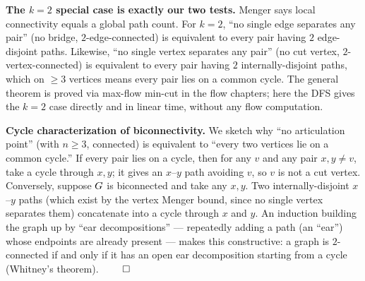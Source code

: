 \begin{whybox}
\textbf{The $k=2$ special case is exactly our two tests.} Menger says local
connectivity equals a global path count. For $k=2$, ``no single edge separates any
pair'' (no bridge, $2$-edge-connected) is equivalent to every pair having $2$
edge-disjoint paths. Likewise, ``no single vertex separates any pair'' (no cut
vertex, $2$-vertex-connected) is equivalent to every pair having $2$
internally-disjoint paths, which on $\ge 3$ vertices means every pair lies on a
common cycle.
The general theorem is proved via max-flow min-cut in the flow chapters; here the DFS
gives the $k=2$ case directly and in linear time, without any flow computation.
\end{whybox}

\begin{formalbox}
\textbf{Cycle characterization of biconnectivity.} We sketch why ``no articulation
point'' (with $n\ge3$, connected) is equivalent to ``every two vertices lie on a common
cycle.'' If every pair lies on a cycle, then for any $v$ and any pair $x,y\neq v$, take
a cycle through $x,y$; it gives an $x$--$y$ path avoiding $v$, so $v$ is not a cut
vertex. Conversely, suppose $G$ is biconnected and take any $x,y$. Two
internally-disjoint $x$--$y$ paths (which exist by the vertex Menger bound, since no
single vertex separates them) concatenate into a cycle through $x$ and $y$. An
induction building the graph up by ``ear decompositions'' --- repeatedly adding a path
(an ``ear'') whose endpoints are already present --- makes this constructive: a graph
is $2$-connected if and only if it has an open ear decomposition starting from a cycle (Whitney's
theorem). $\qed$

\begin{center}
\end{center}
\end{formalbox}

